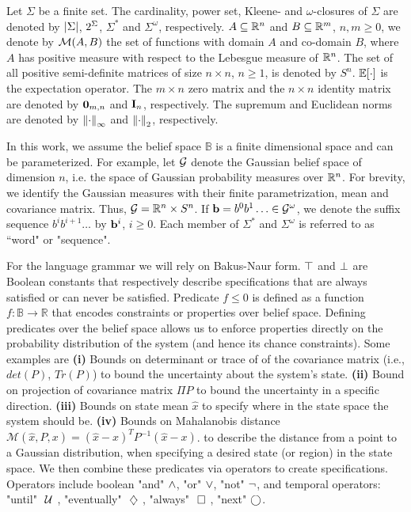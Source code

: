 \documentclass[conference]{IEEEtran}
\begin{document}
    
    Let $\Sigma$ be a finite set. The cardinality,
    power set, Kleene- and $\omega$-closures
    of $\Sigma$ are denoted by $\left| {\Sigma} \right|$,
    $2^{\Sigma}$, $\Sigma^*$ and $\Sigma^\omega$,
    respectively.
    $A \subseteq \mathbb{R}^n$ and $B \subseteq \mathbb{R}^m$,
    $n, m \geq 0$, we denote by $\mathcal{M}(A, B)$ the set of
    functions with domain $A$ and co-domain $B$, where $A$ has positive measure with
    respect to the Lebesgue measure of $\mathbb{R}^n$.
    The set of all positive semi-definite matrices of size
    $n \times n$, $n \geq 1$, is denoted by $S^n$.
    $\mathbb{E}[\cdot]$ is the expectation operator.
    The $m \times n$ zero matrix and
    the $n \times n$ identity matrix are denoted by
    $\mathbf{0}_{m, n}$ and $\mathbf{I}_n$, respectively.
    The supremum and Euclidean norms are denoted by
    $\left\| {\cdot} \right\|_{\infty}$ and $\left\| {\cdot} \right\|_{2}$, respectively.
    
    In this work, we assume the belief space $\mathbb{B}$ is  a finite dimensional space and can be parameterized. For example, let $\mathcal{G}$ denote the Gaussian belief space
    of dimension $n$, i.e. the space of Gaussian
    probability measures over $\mathbb{R}^n$.
    For brevity, we identify the Gaussian measures
    with their finite parametrization, mean and
    covariance matrix. Thus,
    $\mathcal{G} =  \mathbb{R}^n \times  S^n$.
    If $\mathbf{b} = b^0b^1 \ldots \in \mathcal{G}^{\omega}$,
    we denote the suffix sequence $b^i b^{i+1} \ldots$ by
    $\mathbf{b}^i$, $i \geq 0$. Each member of $\Sigma^*$ and $\Sigma^\omega$ is referred to as ``word" or "sequence". 
    
    For the language grammar we will rely on Bakus-Naur form. $\top$ and $\perp$ are Boolean constants that respectively describe specifications that are always satisfied or can never be satisfied. Predicate $f\leq 0$ is defined as a function $f:\mathbb{B}\rightarrow \mathbb{R}$ that encodes constraints or properties over belief space. Defining predicates over the belief space allows us to enforce properties directly on the probability distribution of the system (and hence its chance constraints). Some examples are \textbf{(i)} Bounds on determinant or trace of of the covariance matrix (i.e., $det(P)$, $Tr(P)$) to  bound the uncertainty about the system's state. \textbf{(ii)} Bound on projection of covariance matrix $\Pi P$ to bound the uncertainty in a specific direction.
    \textbf{(iii)} Bounds on state mean $\hat{x}$ to specify
    where in the state space the system should be. \textbf{(iv)} Bounds on Mahalanobis distance $\mathcal{M}(\hat{x},P,x) = (\hat{x}-x)^TP^{-1}(\hat{x}-x)$.
    to describe the distance from a point to a Gaussian distribution, when specifying a desired state (or region) in the state space. We then combine these predicates via operators to create specifications. Operators include boolean "and" $\wedge$, "or" $\vee$, "not" $\neg$, and temporal operators: "until" $\ \mathcal{U}\ $, "eventually" $\ \diamondsuit\ $, "always" $\ \square\ $, "next" $\bigcirc$.
    
\end{document}
